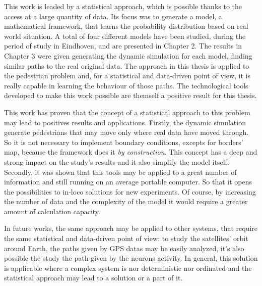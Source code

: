 \documentclass[class=article, crop=false]{standalone}
\begin{document}

This work is leaded by a statistical approach, which is possible thanks to the access at a large quantity of data.
Its focus was to generate a model, a mathematical framework, that learns the probability distribution based on real world situation.
A total of four different models have been studied, during the period of study in Eindhoven, and are presented in Chapter 2.
The results in Chapter 3 were given generating the dynamic simulation for each model, finding similar paths to the real original data.
The approach in this thesis is applied to the pedestrian problem and, for a statistical and data-driven point of view, it is really capable in learning the behaviour of those paths.
The technological tools developed to make this work possible are themself a positive result for this thesis.

This work has proven that the concept of a statistical approach to this problem may lead to positives results and applications.
Firstly, the dynamic simulation generate pedestrians that may move only where real data have moved through.
So it is not necessary to implement boundary conditions, excepts for borders' map, because the framework does it \emph{by construction}.
This concept has a deep and strong impact on the study's results and it also simplify the model itself.
Secondly, it was shown that this tools may be applied to a great number of information and still running on an average portable computer.
So that it opens the possibilities to in-loco solutions for new experiments.
Of course, by increasing the number of data and the complexity of the model it would require a greater amount of calculation capacity.

In future works, the same approach may be applied to other systems, that require the same statistical and data-driven point of view: 
to study the satellites' orbit around Earth, the paths given by GPS datas may be easily analyzed, it's also possible the study the path given by the neurons activity.
In general, this solution is applicable where a complex system is nor deterministic nor ordinated and the statistical approach may lead to a solution or a part of it.
\end{document}
